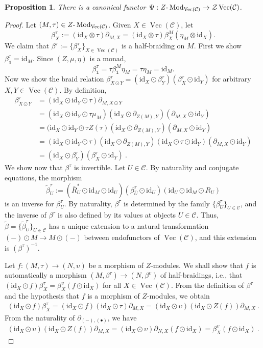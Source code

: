 \documentclass[a4paper,11pt,reqno]{amsart}
\numberwithin{equation}{section}
\newtheorem{proposition}[theorem]{Proposition}
\theoremstyle{remark}
\theoremstyle{definition}
\def\-{{\hbox{-}}}
\newcommand{\cC}{\mathcal C}
\newcommand{\cZ}{\mathcal Z}
\DeclareMathOperator{\Mod}{Mod}
\DeclareMathOperator{\Vect}{Vec}
\newcommand\un{{\mathds 1}}
\newcommand{\id}{\mathrm{id}}
\begin{document}
\begin{proposition}
	There is a canonical functor $\Psi: Z \- \Mod_{\Vect(\cC)} \to \cZ \Vect(\cC)$.
	\label{prop:functormodulestocenter}
\end{proposition}
\begin{proof}
	Let $(M,\tau) \in Z \- \Mod_{\Vect(\cC)}$. Given $X \in \Vect(\cC)$, let
	\[
	\beta^\tau_X := (\id_X \otimes \tau) \partial_{M,X} = (\id_X \otimes \tau) \beta^M_X (\eta_M \otimes \id_X).
	\]
	We claim that $\beta^\tau := \{\beta^\tau_X\}_{X \in \Vect(\cC)}$ is a half-braiding on $M$. First we show $\beta^\tau_\un = \id_M$. Since $(Z,\mu,\eta)$ is a monad, 
	\[
	\beta^\tau_\un = \tau \beta^M_\un \eta_M = \tau \eta_M = \id_M.
	\]
	Now we show the braid relation $\beta^\tau_{X \odot Y} = (\id_X \odot \beta^\tau_Y)(\beta^\tau_X \odot \id_Y)$ for arbitrary $X,Y \in \Vect(\cC)$. By definition,
	\begin{align*}
		\beta^\tau_{X \odot Y} & = (\id_X \odot \id_Y \odot \tau) \partial_{M,X \odot Y} \\
		& = (\id_X \odot \id_Y \odot \tau \mu_M) (\id_X \odot \partial_{Z(M),Y})(\partial_{M,X} \odot \id_Y) \\
		& = (\id_X \odot \id_Y \odot \tau Z(\tau)(\id_X \odot \partial_{Z(M),Y})(\partial_{M,X}\odot \id_Y) \\
		& = (\id_X \odot \id_Y \odot \tau)(\id_X \odot \partial_{Z(M),Y})(\id_X \odot \tau \odot \id_Y)(\partial_{M,X}\odot \id_Y) \\
		& = (\id_X \odot \beta^\tau_Y)(\beta^\tau_X \odot \id_Y) \ . 
	\end{align*}
	We show now that $\beta^\tau$ is invertible. Let $U \in \cC$. By naturality and conjugate equations, the morphism
	\[
	\tilde{\beta}^\tau_U := (\bar{R}_U^* \odot \id_M \odot \id_U) (\beta^\tau_{\bar{U}} \odot \id_U)(\id_U \odot \id_M \odot R_U)
	\]
	is an inverse for $\beta^\tau_U$. By naturality, $\beta^\tau$ is determined by the family $\{\beta^\tau_U\}_{U \in \cC}$, and the inverse of $\beta^\tau$ is also defined by its values at objects $U \in \cC$. Thus, $\tilde{\beta} = \{ \tilde{\beta}^\tau_U\}_{U \in \cC}$ has a unique extension to a natural transformation $(-) \odot M \to M \odot (-)$ between endofunctors of $\Vect(\cC)$, and this extension is $(\beta^\tau)^{-1}$.
	
	
	Let $f: (M,\tau) \to (N,\upsilon)$ be a morphism of $Z$-modules. We shall show that $f$ is automatically a morphism $(M,\beta^\tau) \to (N,\beta^\upsilon)$ of half-braidings, i.e., that $(\id_X \odot f) \beta^\tau_X = \beta^\upsilon_X (f \odot \id_X)$ for all $X \in \Vect(\cC)$. From the definition of $\beta^\tau$ and the hypothesis that $f$ is a morphism of $Z$-modules, we obtain
	\begin{align*}
		(\id_X \odot f) \beta^\tau_X = (\id_X \odot f) (\id_X \odot \tau) \partial_{M,X} 
		= (\id_X \odot \upsilon) (\id_X \odot Z(f)) \partial_{M,X} \ . 
	\end{align*}
	From the naturality of $\partial_{(-),(\bullet)}$, we have
	\begin{align*}
		(\id_X \odot \upsilon) (\id_X \odot Z(f)) \partial_{M,X}  = (\id_X \odot \upsilon) \partial_{N,X} (f \odot \id_X) = \beta^\upsilon_X (f \odot \id_X) \ . 
	\end{align*}
	

\end{proof}
\end{document}
